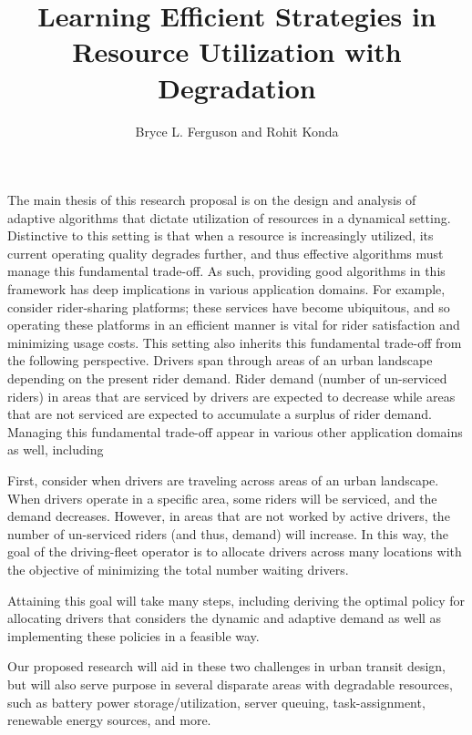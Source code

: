 \documentclass[letterpaper, 10 pt, conference]{ieeeconf}
\begin{document}
\title{Learning Efficient Strategies in Resource Utilization with Degradation}
\author{Bryce L. Ferguson and Rohit Konda}

\maketitle
\thispagestyle{empty}

The main thesis of this research proposal is on the design and analysis of adaptive algorithms that dictate utilization of resources in a dynamical setting. Distinctive to this setting is that when a resource is increasingly utilized, its current operating quality degrades further, and thus effective algorithms must manage this fundamental trade-off. As such, providing good algorithms in this framework has deep implications in various application domains. For example, consider rider-sharing platforms; these services have become ubiquitous, and so operating these platforms in an efficient manner is vital for rider satisfaction and minimizing usage costs. This setting also inherits this fundamental trade-off from the following perspective. Drivers span through areas of an urban landscape depending on the present rider demand. Rider demand (number of un-serviced riders) in areas that are serviced by drivers are expected to decrease while areas that are not serviced are expected to accumulate a surplus of rider demand. Managing this fundamental trade-off appear in various other application domains as well, including 






First, consider when drivers are traveling across areas of an urban landscape. When drivers operate in a specific area, some riders will be serviced, and the demand decreases. However, in areas that are not worked by active drivers, the number of un-serviced riders (and thus, demand) will increase. In this way, the goal of the driving-fleet operator is to allocate drivers across many locations with the objective of minimizing the total number waiting drivers.

Attaining this goal will take many steps, including deriving the optimal policy for allocating drivers that considers the dynamic and adaptive demand as well as implementing these policies in a feasible way.

Our proposed research will aid in these two challenges in urban transit design, but will also serve purpose in several disparate areas with degradable resources, such as battery power storage/utilization, server queuing, task-assignment, renewable energy sources, and more.
\end{document}
